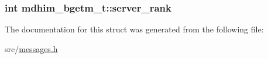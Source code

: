 \hypertarget{structmdhim__bgetm__t_a33b8bbb7a13cf0773954c22b18cac4f4}{
\subsubsection[{server\-\_\-rank}]{\setlength{\rightskip}{0pt plus 5cm}int mdhim\-\_\-bgetm\-\_\-t\-::server\-\_\-rank}}\label{d5/def/structmdhim__bgetm__t_a33b8bbb7a13cf0773954c22b18cac4f4}


The documentation for this struct was generated from the following file\-:\begin{DoxyCompactItemize}
\item 
src/\hyperlink{messages_8h}{messages.\-h}\end{DoxyCompactItemize}
